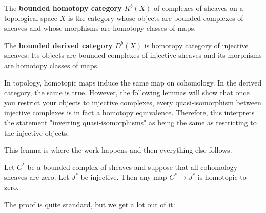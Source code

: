 \begin{definition}

    The \textbf{bounded homotopy category }$K^b(X)$ of complexes of sheaves on a topological space $X$
    is the category whose objects are bounded complexes of sheaves 
    and whose morphisms are homotopy classes of maps.

    \hfill

    The \textbf{bounded derived category} $D^b(X)$ is homotopy category of injective sheaves. Its objects
    are bounded complexes of injective sheaves and its morphisms are homotopy classes of maps.
\end{definition}

\begin{remark}
    In topology, homotopic maps induce the same map on cohomology. In the derived category, the same is true.
    However, the following lemmas will show that once you restrict your objects to injective complexes,
    every quasi-isomorphism between injective complexes is in fact a homotopy equivalence.
    Therefore, this interprets the statement "inverting quasi-isomorphisms" as being the same as 
    restricting to the injective objects.
\end{remark}

This lemma is where the work happens and then everything else follows.
\begin{lemma}
    Let $C^*$ be a bounded complex of sheaves and suppose that all cohomology sheaves are zero. 
    Let $J^*$ be injective. Then any map $C^*\to J^*$ is homotopic to zero.
\end{lemma}
The proof is quite standard, but we get a lot out of it: 

